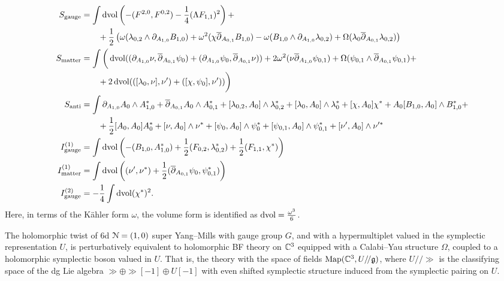 \documentclass[10pt, oneside]{article}
\begin{document}
\begin{align*}
S_{\mathrm{gauge}} &= \int \operatorname{dvol} \left(-(F^{2, 0}, F^{0, 2}) - \frac{1}{4}(\Lambda F_{1, 1})^2\right) + \\
&\qquad + \frac 12 \left( \omega(\lambda_{0,2} \wedge \partial_{A_{1,0}} B_{1,0}) + \omega^2(\chi \overline{\partial}_{A_{0,1}} B_{1,0}) - \omega(B_{1,0} \wedge \partial_{A_{1,0}} \lambda_{0,2}) + \Omega(\lambda_0 \overline{\partial}_{A_{0,1}} \lambda_{0,2})   \right)  \\
S_{\mathrm{matter}} &= \int \bigg( \operatorname{dvol} ((\partial_{A_{1,0}}\nu, \overline{\partial}_{A_{0,1}} \psi_0) + (\partial_{A_{1,0}}\psi_0, \overline{\partial}_{A_{0,1}} \nu)) + 2\omega^2(\nu \overline{\partial}_{A_{1,0}} \psi_{0,1}) + \Omega(\psi_{0,1} \wedge \overline{\partial}_{A_{0,1}} \psi_{0,1}) + \\
&\qquad + 2\operatorname{dvol}(([\lambda_0,\nu],\nu') + ([\chi, \psi_0], \nu') )   \bigg) \\
S_{\mathrm{anti}} &= \int \partial_{A_{1, 0}} A_0 \wedge A_{1, 0}^* + \overline{\partial}_{A_{0, 1}} A_0\wedge A_{0, 1}^* + [\lambda_{0,2}, A_0]\wedge \lambda_{0,2}^* +  [\lambda_{0}, A_0]\wedge \lambda_{0}^* + [\chi, A_0]\chi^* +A_0[B_{1,0}, A_0]\wedge B_{1,0}^* + \\
&\qquad + \frac{1}{2}[A_0, A_0]A_0^* + [\nu, A_0]\wedge \nu^* + [\psi_{0}, A_0]\wedge \psi_{0}^* + [\psi_{0,1}, A_0]\wedge \psi_{0,1}^* + [\nu', A_0]\wedge \nu'^* \\
I^{(1)}_{\mathrm{gauge}} &=  \int \operatorname{dvol} \left( - (B_{1,0}, A_{1,0}^*) + \frac 12 (F_{0,2},\lambda_{0,2}^*) + \frac 12 (F_{1,1}, \chi^*)  \right)\\
I^{(1)}_{\mathrm{matter}} &=  \int \operatorname{dvol} \left( (\nu', \nu^*) + \frac 12( \overline{\partial}_{A_{0,1}} \psi_0, \psi_{0,1}^*) \right)\\
I^{(2)}_{\mathrm{gauge}} &= -\frac{1}{4}\int \operatorname{dvol} (\chi^*)^2.
\end{align*}
Here, in terms of the K\"ahler form $\omega$, the volume form is identified as $\operatorname{dvol} = \frac{\omega^3}6$.

\begin{thm}
The holomorphic twist of 6d $\mathcal{N}=(1, 0)$ super Yang--Mills with gauge group $G$, and with a hypermultiplet valued in the symplectic representation $U$, is perturbatively equivalent to holomorphic BF theory on $\mathbb C^3$ equipped with a Calabi--Yau structure $\Omega$, coupled to a holomorphic symplectic boson valued in $U$.  That is, the theory with the space of fields $\mathrm{Map}(\mathbb C^3, U/\!/\mathfrak{g})$, where $U/\!/\gg$ is the classifying space of the dg Lie algebra $\gg \oplus \gg[-1] \oplus U[-1]$ with even shifted symplectic structure induced from the symplectic pairing on $U$. 
\label{thm:6dholomorphictwist}
\end{thm}
\end{document}
